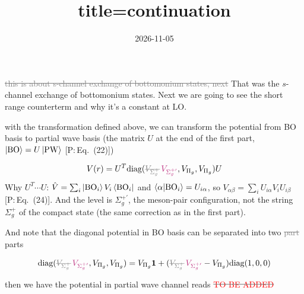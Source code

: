 \documentclass[11pt]{article}
\title{title=continuation}
\author{}
\date{2026-11-05}
\newcommand{\todo}{\textcolor{red}{TO BE ADDED}}
\newcommand{\tagP}[1]{\textcolor{blue!65!black}{\textsf{\small[P:\,#1]}}}
\newcommand{\ai}[1]{\textcolor{aicolor}{#1}}
\newcommand{\aifix}[2]{\textcolor{gray}{\sout{#1}} \textcolor{aicolor}{#2}}
\newcommand{\aifixm}[2]{\textcolor{gray}{\text{\sout{$#1$}}}\,\textcolor{aicolor}{#2}}
\newcommand{\ai}[1]{#1}
\newcommand{\aifix}[2]{#2}
\newcommand{\aifixm}[2]{#2}
\begin{document}
\maketitle

\aifix{this is about s-channel exchange of bottomonium states, next}{That was the $s$-channel exchange of bottomonium states. Next} we are going to see the short range counterterm and why it's a constant at LO.

with the transformation defined above, we can transform the potential from BO basis to partial wave basis \ai{(the matrix $U$ at the end of the first part, $\ket{\rm BO}=U\ket{\rm PW}$ \tagP{Eq.~(22)})}

\begin{equation}
	V(r) = U^T \text{diag}(\aifixm{V_{\Sigma_g^+}}{V_{\Sigma_g^{+\prime}}}, V_{\Pi_g}, V_{\Pi_g})U
\end{equation}
\ai{Why $U^T\cdots U$: $\hat V=\sum_i\ket{{\rm BO}_i}V_i\bra{{\rm BO}_i}$ and $\braket{\alpha|{\rm BO}_i}=U_{i\alpha}$, so $V_{\alpha\beta}=\sum_iU_{i\alpha}V_iU_{i\beta}$ \tagP{Eq.~(24)}. And the level is $\Sigma_g^{+\prime}$, the meson-pair configuration, not the string $\Sigma_g^+$ of the compact state (the same correction as in the first part).}

And note that the diagonal potential in BO basis can be separated into two \aifix{part}{parts}

\begin{equation}
	\text{diag}(\aifixm{V_{\Sigma_g^+}}{V_{\Sigma_g^{+\prime}}}, V_{\Pi_g}, V_{\Pi_g}) = V_{\Pi_g} {\bm 1} + (\aifixm{V_{\Sigma_g^+}}{V_{\Sigma_g^{+\prime}}} - V_{\Pi_g}) \text{diag}(1,0,0)
\end{equation}

then we have the potential in partial wave channel reads \aifix{\todo}{}
\end{document}
